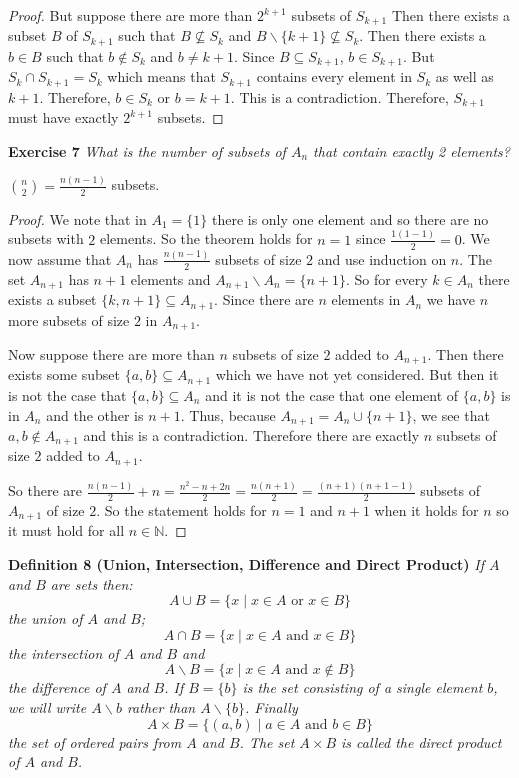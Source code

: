 \documentclass{article}
\begin{document}
\begin{flushleft}
\begin{proof}
But suppose there are more than $2^{k+1}$ subsets of $S_{k+1}$ Then there exists a subset $B$ of $S_{k+1}$ such that $B \nsubseteq S_k$ and $B \backslash \{k+1\} \nsubseteq S_k$. Then there exists a $b \in B$ such that $b \notin S_k$ and $b \neq k+1$. Since $B \subseteq S_{k+1}$, $b \in S_{k+1}$. But $S_k \cap S_{k+1} = S_k$ which means that $S_{k+1}$ contains every element in $S_k$ as well as $k+1$. Therefore, $b \in S_k$ or $b = k+1$. This is a contradiction. Therefore, $S_{k+1}$ must have exactly $2^{k+1}$ subsets.
\end{proof}

\textbf{Exercise 7}
\textsl{What is the number of subsets of $A_n$ that contain exactly 2 elements?}\newline

$\binom{n}{2} = \frac{n(n-1)}{2}$ subsets.\newline

\begin{proof}
We note that in $A_1 = \{1\}$ there is only one element and so there are no subsets with $2$ elements. So the theorem holds for $n=1$ since $\frac{1(1-1)}{2}=0$. We now assume that $A_{n}$ has $\frac{n(n-1)}{2}$ subsets of size $2$ and use induction on $n$. The set $A_{n+1}$ has $n+1$ elements and $A_{n+1} \backslash A_n = \{n+1\}$. So for every $k \in A_n$ there exists a subset $\{k,n+1\} \subseteq A_{n+1}$. Since there are $n$ elements in $A_n$ we have $n$ more subsets of size $2$ in $A_{n+1}$.\newline

Now suppose there are more than $n$ subsets of size $2$ added to $A_{n+1}$. Then there exists some subset $\{a,b\} \subseteq A_{n+1}$ which we have not yet considered. But then it is not the case that $\{a,b\} \subseteq A_n$ and it is not the case that one element of $\{a,b\}$ is in $A_n$ and the other is $n+1$. Thus, because $A_{n+1} = A_n \cup \{n+1\}$, we see that $a,b \notin A_{n+1}$ and this is a contradiction. Therefore there are exactly $n$ subsets of size $2$ added to $A_{n+1}$.\newline

So there are $\frac{n(n-1)}{2} + n = \frac{n^2-n+2n}{2} = \frac{n(n+1)}{2} = \frac{(n+1)(n+1-1)}{2}$ subsets of $A_{n+1}$ of size $2$. So the statement holds for $n=1$ and $n+1$ when it holds for $n$ so it must hold for all $n \in \mathbb{N}$.
\end{proof}

\textbf{Definition 8 (Union, Intersection, Difference and Direct Product)}
\textsl{If $A$ and $B$ are sets then:
\[
A \cup B = \{x \mid x \in A \text{ or } x \in B\}
\]
the union of $A$ and $B$;
\[
A \cap B = \{x \mid x \in A \text{ and } x \in B\}
\]
the intersection of $A$ and $B$ and
\[
A \backslash B = \{x \mid x \in A \text{ and } x \notin B\}
\]
the difference of $A$ and $B$. If $B = \{b\}$ is the set consisting of a single element $b$, we will write $A \backslash b$ rather than $A \backslash \{b\}$. Finally
\[
A \times B = \{(a,b) \mid a \in A \text{ and } b \in B\}
\]
the set of ordered pairs from $A$ and $B$. The set $A \times B$ is called the direct product of $A$ and $B$.}\newline


\end{flushleft}
\end{document}
